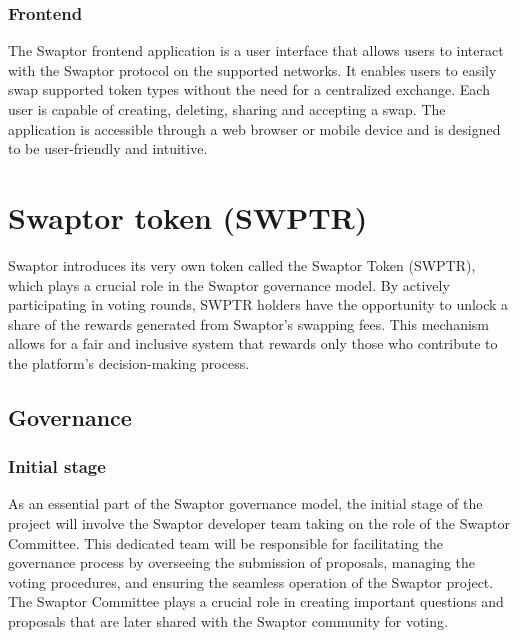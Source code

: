 \documentclass[12pt]{article}
\begin{document}
\subsubsection{Frontend}
The Swaptor frontend application is a user interface that allows users to interact
with the Swaptor protocol on the supported networks. It enables users to easily swap
supported token types without the need for a centralized exchange. Each user is capable
of creating, deleting, sharing and accepting a swap. The application is accessible through a
web browser or mobile device and is designed to be user-friendly and intuitive.

\section{Swaptor token (SWPTR)}

Swaptor introduces its very own token called the Swaptor Token (SWPTR), which plays a
crucial role in the Swaptor governance model. By actively participating in voting rounds,
SWPTR holders have the opportunity to unlock a share of the rewards generated from Swaptor's swapping fees.
This mechanism allows for a fair and inclusive system that rewards only those who contribute to the platform's decision-making process.

\subsection{Governance}

\subsubsection{Initial stage}
As an essential part of the Swaptor governance model, the initial stage of the project will
involve the Swaptor developer team taking on the role of the Swaptor Committee. This dedicated
team will be responsible for facilitating the governance process by overseeing the submission of proposals,
managing the voting procedures, and ensuring the seamless operation of the Swaptor project.
The Swaptor Committee plays a crucial role in creating important questions and proposals that are later shared
with the Swaptor community for voting.
\end{document}
